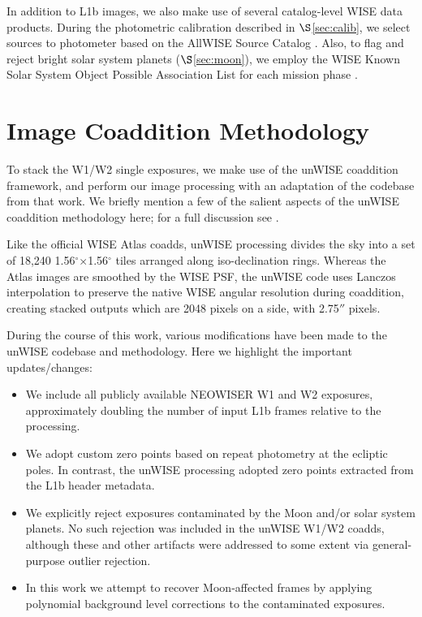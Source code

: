 \documentclass{emulateapj}
\begin{document}
In addition to L1b images, we also make use of several catalog-level WISE
data products. During the photometric calibration described in 
$\S$\ref{sec:calib}, we select sources to photometer based on the AllWISE 
Source Catalog \citep{cutri13}. Also, to flag and reject bright solar system 
planets ($\S$\ref{sec:moon}), we employ the WISE Known Solar System Object
Possible Association List for each mission phase 
\citep{cutri12, cutri13,cutri15}.

\section{Image Coaddition Methodology}
\label{sec:coadd}

To stack the W1/W2 single exposures, we make use of the \cite{lang14}
unWISE coaddition framework, and perform our image processing with an 
adaptation of the codebase from that work. We briefly mention
a few of the salient aspects of the unWISE coaddition methodology here; for
a full discussion see \cite{lang14}.

Like the official WISE Atlas coadds, unWISE processing divides the sky
into a set of 18,240 1.56$^{\circ}$$\times$1.56$^{\circ}$ tiles
arranged along iso-declination rings. Whereas the Atlas images
are smoothed by the WISE PSF, the unWISE code uses Lanczos interpolation to 
preserve the native WISE angular resolution during coaddition, creating stacked
outputs which are 2048 pixels on a side, with 2.75$''$ pixels.

During the course of this work, various modifications have been made to the
 unWISE codebase and methodology. Here we highlight the important 
updates/changes:

\begin{itemize}
\item We include all publicly available NEOWISER W1 and W2 exposures, 
approximately doubling the number of input L1b frames relative to the 
\cite{lang14} processing.
\item We adopt custom zero points based on repeat photometry at the ecliptic 
poles. In contrast, the \cite{lang14} unWISE processing adopted zero points 
extracted from the L1b header metadata.
\item We explicitly reject exposures contaminated by the Moon and/or solar 
system planets. No such rejection was included in the \cite{lang14} unWISE 
W1/W2 coadds, although these and other artifacts were addressed to some extent 
via general-purpose outlier rejection.
\item In this work we attempt to recover Moon-affected frames by applying 
polynomial background level corrections to the contaminated exposures.
\end{itemize}
\end{document}

